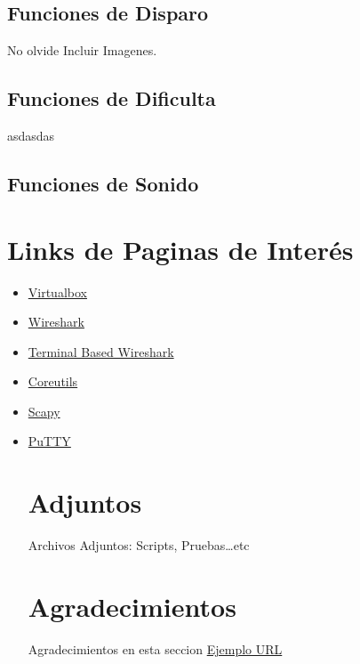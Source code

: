 \documentclass[a4paper]{article}
\begin{document}
\subsection{Funciones de Disparo}
No olvide Incluir Imagenes.
\subsection{Funciones de Dificulta}
asdasdas
\subsection{Funciones de Sonido}

\clearpage
\newpage
\section{Links de Paginas de Interés \label{Herramientas}}
\begin{itemize}
\item \href{http://virtualbox.org}{Virtualbox}
\item \href{www.wireshark.org}{Wireshark}
\item \href{www.wireshark.org}{Terminal Based Wireshark}
\item \href{http://www.gnu.org/software/coreutils/}{Coreutils}
\item \href{http://www.secdev.org/projects/scapy/}{Scapy}
\item \href{http://www.chiark.greenend.org.uk/~sgtatham/putty/}{PuTTY}
\clearpage
\newpage
\section{Adjuntos}
Archivos Adjuntos: Scripts, Pruebas\ldots etc 
\clearpage
\newpage
\section{Agradecimientos}
Agradecimientos en esta seccion \href{http://www.ejemplourl.org}{Ejemplo URL} 

\end{itemize}
\end{document}
